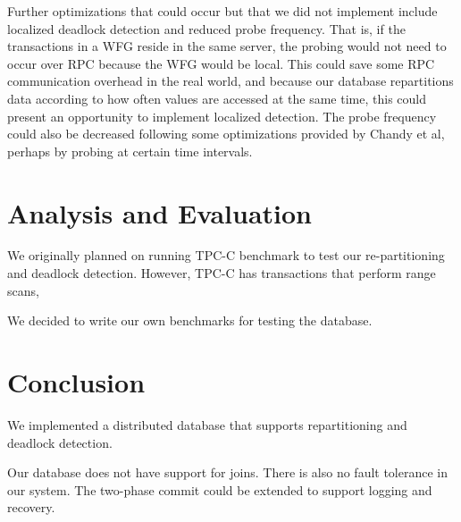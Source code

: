 \documentclass[a4paper, 10pt, notitlepage]{report}
\begin{document}
Further optimizations that could occur but that we did not implement include localized deadlock detection and reduced probe frequency. That is, if the transactions in a WFG reside in the same server, the probing would not need to occur over RPC because the WFG would be local. This could save some RPC communication overhead in the real world, and because our database repartitions data according to how often values are accessed at the same time, this could present an opportunity to implement localized detection. The probe frequency could also be decreased following some optimizations provided by Chandy et al, perhaps by probing at certain time intervals.

\section*{Analysis and Evaluation}
We originally planned on running TPC-C benchmark to test our re-partitioning and deadlock detection.
However, TPC-C has transactions that perform range scans, 

We decided to write our own benchmarks for testing the database.

\section*{Conclusion}
We implemented a distributed database that supports repartitioning and deadlock detection.

Our database does not have support for joins. There is also no fault tolerance in our system. The two-phase commit could be extended to support logging and recovery.

\begin{comment}
\chapter*{Bibliography}
%
\begin{description}

\item Author, I. (Year). \emph{Book Title}, Publisher; Place of publication.

\item Lamport, L. (1986), \emph{\LaTeX: A Document Preparation System}, Addison-Wesley; Reading, MA.

\item Author, I. (Year). `Journal article title', \emph{Journal}, \textbf{Vol}, pp.first--last.

\item Smith, A.D.A.C. and Wand, M.P. (2008). `Streamlined variance calculations for semiparametric
mixed models', \emph{Statistics in Medicine}, \textbf{27}, pp.435--48.

\end{description}
\end{comment}
\end{document}
